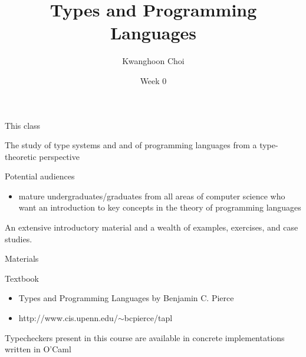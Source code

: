 \documentclass[table]{beamer}
\title[Types and Programming Languages]{Types and Programming Languages}
\author[K. Choi]{Kwanghoon Choi}
\institute[Chonnam National University]{
Software Languages and Systems Laboratory \\
	Chonnam National University}
\date{Week 0}
\begin{document}
\begin{frame}
	\titlepage
	
\end{frame}


\begin{frame}[t]{This class} \vspace{10pt}

The study of type systems and and of programming languages from a type-theoretic perspective

\vspace{10pt}

Potential audiences 
\begin{itemize}
\item mature undergraduates/graduates from all areas of computer science who want an introduction to key concepts in the theory of programming languages
\end{itemize}

\vspace{10pt}

An extensive introductory material and a wealth of examples, exercises, and case studies. 

\end{frame}

\begin{frame}[t]{Materials} \vspace{10pt}

Textbook
\begin{itemize}
\item Types and Programming Languages by Benjamin C. Pierce
\item http://www.cis.upenn.edu/$\sim$bcpierce/tapl
\end{itemize}

\vspace{10pt}

Typecheckers present in this course are available in concrete implementations written in O'Caml 

\end{frame}
\end{document}

